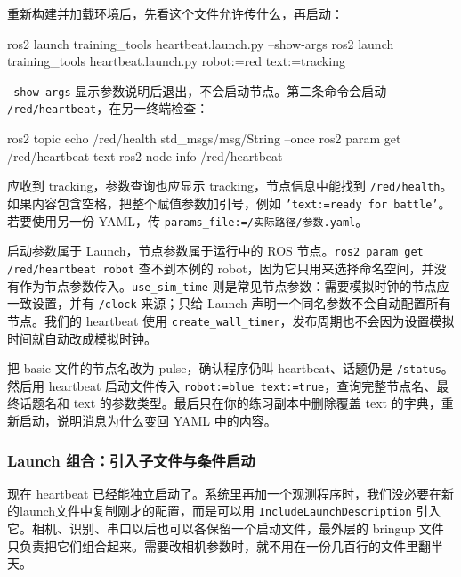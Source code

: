\begin{example}
重新构建并加载环境后，先看这个文件允许传什么，再启动：
\par\medskip\noindent\begin{minipage}{\linewidth}
\begin{tbash}
ros2 launch training_tools heartbeat.launch.py --show-args
ros2 launch training_tools heartbeat.launch.py robot:=red text:=tracking
\end{tbash}
\end{minipage}\par\smallskip
\texttt{--show-args} 显示参数说明后退出，不会启动节点。第二条命令会启动 \nolinkurl{/red/heartbeat}，在另一终端检查：
\par\medskip\noindent\begin{minipage}{\linewidth}
\begin{tbash}
ros2 topic echo /red/health std_msgs/msg/String --once
ros2 param get /red/heartbeat text
ros2 node info /red/heartbeat
\end{tbash}
\end{minipage}\par\smallskip
应收到 tracking，参数查询也应显示 tracking，节点信息中能找到 \texttt{/red/health}。如果内容包含空格，把整个赋值参数加引号，例如 \texttt{'text:=ready for battle'}。若要使用另一份 YAML，传 \texttt{params\_file:=/实际路径/参数.yaml}。
\end{example}

\begin{note}
启动参数属于 Launch，节点参数属于运行中的 ROS 节点。\texttt{ros2 param get /red/heartbeat robot} 查不到本例的 robot，因为它只用来选择命名空间，并没有作为节点参数传入。\texttt{use\_sim\_time} 则是常见节点参数：需要模拟时钟的节点应一致设置，并有 \texttt{/clock} 来源；只给 Launch 声明一个同名参数不会自动配置所有节点。我们的 heartbeat 使用 \nolinkurl{create_wall_timer}，发布周期也不会因为设置模拟时间就自动改成模拟时钟。
\end{note}

\begin{exercise}
\label{ex:v2-ros-launch-basic}
把 basic 文件的节点名改为 pulse，确认程序仍叫 heartbeat、话题仍是 \texttt{/status}。然后用 heartbeat 启动文件传入 \texttt{robot:=blue text:=true}，查询完整节点名、最终话题名和 text 的参数类型。最后只在你的练习副本中删除覆盖 text 的字典，重新启动，说明消息为什么变回 YAML 中的内容。
\end{exercise}

\subsubsection{Launch 组合：引入子文件与条件启动}
现在 heartbeat 已经能独立启动了。系统里再加一个观测程序时，我们没必要在新的launch文件中复制刚才的配置，而是可以用 \nolinkurl{IncludeLaunchDescription} 引入它。相机、识别、串口以后也可以各保留一个启动文件，最外层的 bringup 文件只负责把它们组合起来。需要改相机参数时，就不用在一份几百行的文件里翻半天。

